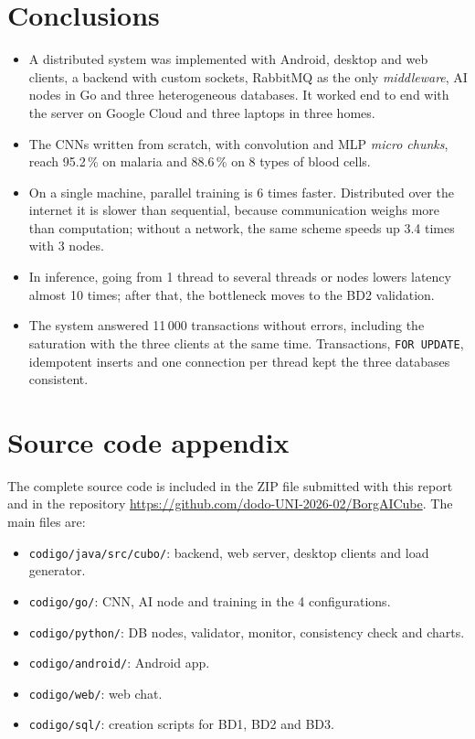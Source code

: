 \documentclass[10pt,a4paper]{article}
\begin{document}
\section{Conclusions}

\begin{itemize}
    \item A distributed system was implemented with Android, desktop and web clients, a backend with
    custom sockets, RabbitMQ as the only \textit{middleware}, AI nodes in Go and three heterogeneous
    databases. It worked end to end with the server on Google Cloud and three laptops in three homes.
    \item The CNNs written from scratch, with convolution and MLP \textit{micro chunks}, reach 95.2\,\%
    on malaria and 88.6\,\% on 8 types of blood cells.
    \item On a single machine, parallel training is 6 times faster. Distributed over the internet it is
    slower than sequential, because communication weighs more than computation; without a network, the
    same scheme speeds up 3.4 times with 3 nodes.
    \item In inference, going from 1 thread to several threads or nodes lowers latency almost 10 times;
    after that, the bottleneck moves to the BD2 validation.
    \item The system answered 11\,000 transactions without errors, including the saturation with the
    three clients at the same time. Transactions, \texttt{FOR UPDATE}, idempotent inserts and one
    connection per thread kept the three databases consistent.
\end{itemize}

\section{Source code appendix}

The complete source code is included in the ZIP file submitted with this report and in the repository
\url{https://github.com/dodo-UNI-2026-02/BorgAICube}. The main files are:
\begin{itemize}
    \item \texttt{codigo/java/src/cubo/}: backend, web server, desktop clients and load generator.
    \item \texttt{codigo/go/}: CNN, AI node and training in the 4 configurations.
    \item \texttt{codigo/python/}: DB nodes, validator, monitor, consistency check and charts.
    \item \texttt{codigo/android/}: Android app.
    \item \texttt{codigo/web/}: web chat.
    \item \texttt{codigo/sql/}: creation scripts for BD1, BD2 and BD3.
\end{itemize}
\end{document}
